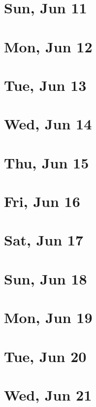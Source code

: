 	\section{Sun, Jun 11}
		
	\section{Mon, Jun 12}
		
	\section{Tue, Jun 13}
		
	\section{Wed, Jun 14}
		
	\section{Thu, Jun 15}
		
	\section{Fri, Jun 16}
		
	\section{Sat, Jun 17}
		
	\section{Sun, Jun 18}
		
	\section{Mon, Jun 19}
		
	\section{Tue, Jun 20}
		
	\section{Wed, Jun 21}
		
